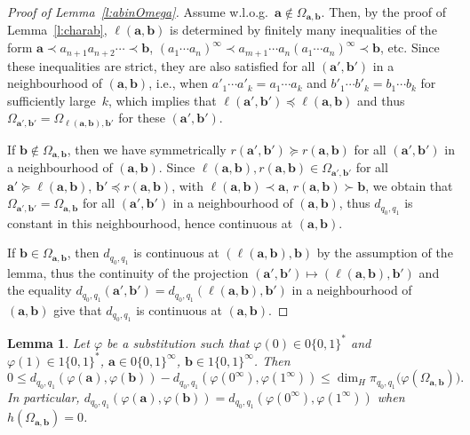 \documentclass{amsart}
\newtheorem{lemma}[theorem]{Lemma}
\theoremstyle{definition}
\numberwithin{equation}{section}
\newcommand{\ba}{\mathbf{a}}
\newcommand{\bb}{\mathbf{b}}
\begin{document}
\begin{proof}[Proof of Lemma~\ref{l:abinOmega}]
Assume w.l.o.g.\ $\ba \notin \Omega_{\ba,\bb}$.
Then, by the proof of Lemma~\ref{l:charab}, $\ell(\ba,\bb)$ is determined by finitely many inequalities of the form $\ba \prec a_{n+1}a_{n+2}\cdots \prec \bb$, $(a_1\cdots a_n)^\infty \prec a_{m+1}\cdots a_n(a_1\cdots a_n)^\infty \prec \bb$, etc. 
Since these inequalities are strict, they are also satisfied for all $(\ba',\bb')$ in a neighbourhood of $(\ba,\bb)$, i.e., when $a'_1\cdots a'_k = a_1\cdots a_k$ and $b'_1\cdots b'_k = b_1\cdots b_k$ for sufficiently large~$k$, which implies that $\ell(\ba',\bb') \preceq \ell(\ba,\bb)$ and thus $\Omega_{\ba',\bb'} = \Omega_{\ell(\ba,\bb),\bb'}$ for these $(\ba',\bb')$. 

If $\bb \notin \Omega_{\ba,\bb}$, then we have symmetrically $r(\ba',\bb') \succeq r(\ba,\bb)$ for all $(\ba',\bb')$ in a neighbourhood of $(\ba,\bb)$.
Since $\ell(\ba,\bb), r(\ba,\bb) \in \Omega_{\ba',\bb'}$ for all $\ba' \succeq \ell(\ba,\bb)$, $\bb' \preceq r(\ba,\bb)$, with $\ell(\ba,\bb) \prec \ba$, $r(\ba,\bb) \succ \bb$, we obtain that $\Omega_{\ba',\bb'} = \Omega_{\ba,\bb}$ for all $(\ba',\bb')$ in a neighbourhood of $(\ba,\bb)$, thus $d_{q_0,q_1}$ is constant in this neighbourhood, hence continuous at $(\ba,\bb)$. 

If $\bb \in \Omega_{\ba,\bb}$, then $d_{q_0,q_1}$ is continuous at $(\ell(\ba,\bb),\bb)$ by the assumption of the lemma, thus the continuity of the projection $(\ba',\bb') \mapsto (\ell(\ba,\bb),\bb')$ and the equality $d_{q_0,q_1}(\ba',\bb') = d_{q_0,q_1}(\ell(\ba,\bb),\bb')$ in a neighbourhood of $(\ba,\bb)$ give that $d_{q_0,q_1}$ is continuous at $(\ba,\bb)$. 
\end{proof}

\begin{lemma} \label{l:phi}
Let $\varphi$ be a substitution such that $\varphi(0) \in 0\{0,1\}^*$ and $\varphi(1) \in 1\{0,1\}^*$, $\ba \in 0\{0,1\}^\infty$, $\bb \in 1\{0,1\}^\infty$.
Then
\[
0 \le d_{q_0,q_1}(\varphi(\ba),\varphi(\bb)) - d_{q_0,q_1}(\varphi(0^\infty),\varphi(1^\infty)) \le \dim_H \pi_{q_0,q_1}\big(\varphi(\Omega_{\ba,\bb})\big).
\]
In particular, $d_{q_0,q_1}(\varphi(\ba),\varphi(\bb)) = d_{q_0,q_1}(\varphi(0^\infty),\varphi(1^\infty))$ when $h(\Omega_{\ba,\bb}) = 0$.
\end{lemma}
\end{document}

